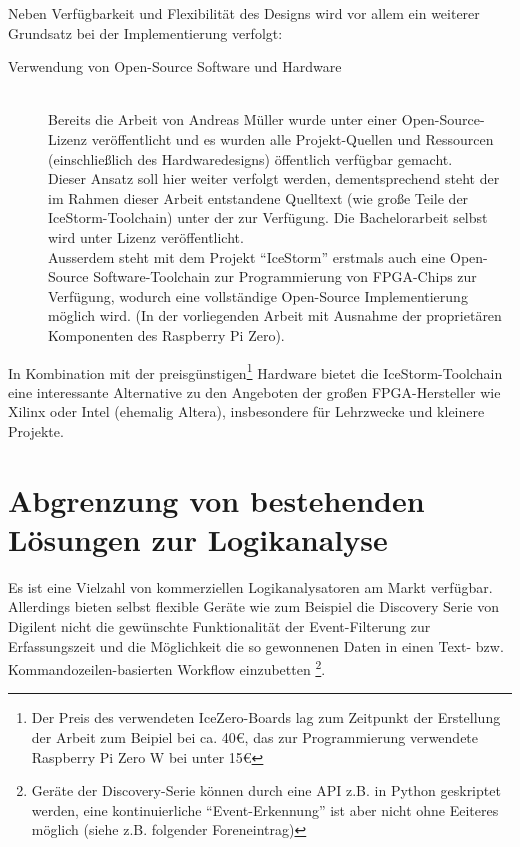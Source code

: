 Neben Verfügbarkeit und Flexibilität des Designs wird vor allem ein weiterer Grundsatz bei der Implementierung verfolgt:
\begin{description}
\item[Verwendung von Open-Source Software und Hardware] \hfill \\
Bereits die Arbeit von Andreas Müller wurde unter einer Open-Source-Lizenz veröffentlicht und es wurden alle Projekt-Quellen und Ressourcen (einschließlich des Hardwaredesigns) öffentlich verfügbar gemacht.\\
Dieser Ansatz soll hier weiter verfolgt werden, dementsprechend steht der im Rahmen dieser Arbeit entstandene Quelltext (wie große Teile der IceStorm-Toolchain) unter der  zur Verfügung. Die Bachelorarbeit selbst wird unter  Lizenz veröffentlicht.\\
Ausserdem steht mit dem Projekt ``IceStorm'' erstmals auch eine Open-Source Software-Toolchain zur Programmierung von FPGA-Chips zur Verfügung, wodurch eine vollständige Open-Source Implementierung möglich wird. (In der vorliegenden Arbeit mit Ausnahme der proprietären Komponenten des Raspberry Pi Zero).
\end{description}
In Kombination mit der preisgünstigen\footnote{Der Preis des verwendeten IceZero-Boards lag zum Zeitpunkt der Erstellung der Arbeit zum Beipiel bei ca. 40€, das zur Programmierung verwendete Raspberry Pi Zero W bei unter 15€} Hardware bietet die IceStorm-Toolchain eine interessante Alternative zu den Angeboten der großen FPGA-Hersteller wie Xilinx oder Intel (ehemalig Altera), insbesondere für Lehrzwecke und kleinere Projekte.

\clearpage 
 
\section{Abgrenzung von bestehenden Lösungen zur Logikanalyse}

Es ist eine Vielzahl von kommerziellen Logikanalysatoren am Markt verfügbar. Allerdings bieten selbst flexible Geräte wie zum Beispiel die Discovery Serie von Digilent nicht die gewünschte Funktionalität der Event-Filterung zur Erfassungszeit und die Möglichkeit die so gewonnenen Daten in einen Text- bzw. Kommandozeilen-basierten Workflow einzubetten \footnote{Geräte der Discovery-Serie können durch eine \acrshort{API} z.B. in Python geskriptet werden, eine kontinuierliche ``Event-Erkennung'' ist aber nicht ohne Eeiteres möglich (siehe z.B. folgender Foreneintrag\cite{forum:digilent}) }. 

